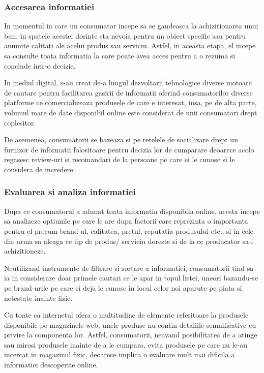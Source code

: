 \documentclass[a4paper, 12pt]{article}
\begin{document}
		\subsubsection{Accesarea informatiei}
		\quad\quad
		 In momentul in care un consumator incepe sa se gandeasca la  achizitionarea unui bun, in spatele acestei dorinte sta nevoia pentru un obiect specific sau pentru anumite calitati ale acelui produs sau serviciu. Astfel, in aceasta etapa, el incepe sa consulte toata informatia la care poate avea acces pentru a o rezuma si conclude intr-o decizie.
		
 		\quad In mediul digital, s-au creat de-a lungul dezvoltarii tehnologice diverse motoare de cautare pentru facilitarea gasirii de informatii oferind consumatorilor diverse platforme ce comercializeaza produsele de care e interesat, insa, pe de alta parte, volumul mare de date disponibil online este considerat de unii consumatori drept coplesitor.
		 
	 	\quad De asemenea, consumatorii se bazeaza  si pe  retelele de socializare drept un furnizor de informatii folositoare pentru decizia lor de cumparare deoarece acolo regasesc review-uri si recomandari de la persoane pe care ei le cunosc si le considera de incredere.
		
		\subsubsection{Evaluarea si analiza informatiei }
		
		\quad\quad Dupa ce consumatorul a adunat toata informatia disponibila online, acesta incepe sa analizeze optiunile pe care le are dupa factorii care reprezinta o importanta pentru el precum brand-ul, calitatea, pretul, reputatia produsului etc., si in cele din urma sa aleaga ce tip de produs/ serviciu doreste si de la ce producator sa-l achizitioneze.
		
		\quad Neutilizand instrumente de filtrare si sortare a informatiei, consumatorii tind sa ia in considerare doar primele cautari ce le apar in topul listei, uneori bazandu-se pe brand-urile pe care ei deja le cunosc in locul celor noi aparute pe piata si netestate inainte fizic.
		
		\quad Cu toate ca internetul ofera o multitudine de elemente referitoare la produsele disponibile pe magazinele web, unele produse nu contin detaliile semnificative cu privire la componenta lor. Astfel, consumatorii, neavand posibilitatea de a atinge sau mirosi produsele inainte de a le cumpara, evita produsele pe care nu le-au incercat in magazinul fizic, deoarece implica o evaluare mult mai dificila a informatiei descoperite online.
		
\end{document}
